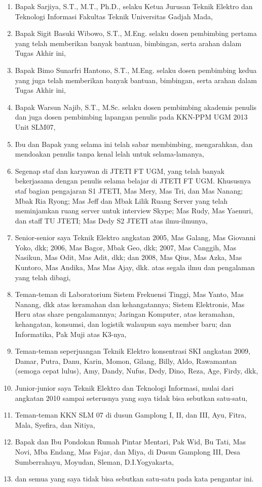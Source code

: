\documentclass{jtetiskripsi}
\begin{document}
\begin{enumerate}
\item{Bapak Sarjiya, S.T., M.T., Ph.D., selaku Ketua Jurusan Teknik Elektro dan Teknologi Informasi Fakultas Teknik Universitas Gadjah Mada,}
\item{Bapak Sigit Basuki Wibowo, S.T., M.Eng. selaku dosen pembimbing pertama yang telah memberikan banyak bantuan, bimbingan, serta arahan dalam Tugas Akhir ini,}
\item{Bapak Bimo Sunarfri Hantono, S.T., M.Eng. selaku dosen pembimbing kedua yang juga telah memberikan banyak bantuan, bimbingan, serta arahan dalam Tugas Akhir ini,}
\item{Bapak Warsun Najib, S.T., M.Sc. selaku dosen pembimbing akademis penulis dan juga dosen pembimbing lapangan penulis pada KKN-PPM UGM 2013 Unit SLM07,}
\item{Ibu dan Bapak yang selama ini telah sabar membimbing, mengarahkan, dan mendoakan penulis tanpa kenal lelah untuk selama-lamanya,}
\item{Segenap staf dan karyawan di JTETI FT UGM, yang telah banyak bekerjasama dengan penulis selama belajar di JTETI FT UGM. Khususnya staf bagian pengajaran S1 JTETI, Mas Mery, Mas Tri, dan Mas Nanang; Mbak Ria Ryong; Mas Jeff dan Mbak Lilik Ruang Server yang telah meminjamkan ruang server untuk interview Skype; Mas Rudy, Mas Yaenuri, dan staff TU JTETI; Mas Dedy S2 JTETI atas ilmu-ilmunya,} 
\item{Senior-senior saya Teknik Elektro angkatan 2005, Mas Galang, Mas Giovanni Yoko, dkk; 2006, Mas Bagor, Mbak Geo, dkk; 2007, Mas Canggih, Mas Nasikun, Mas Odit, Mas Adit, dkk; dan 2008, Mas Qius, Mas Azka, Mas Kuntoro, Mas Andika, Mas Mas Ajay, dkk. atas segala ilmu dan pengalaman yang telah dibagi,}
\item{Teman-teman di Laboratorium Sistem Frekuensi Tinggi, Mas Yanto, Mas Nanang, dkk atas keramahan dan kehangatannya; Sistem Elektronis, Mas Heru atas share pengalamannya; Jaringan Komputer, atas keramahan, kehangatan, konsumsi, dan logistik walaupun saya member baru; dan Informatika, Pak Muji atas K3-nya,}
\item{Teman-teman seperjuangan Teknik Elektro konsentrasi SKI angkatan 2009, Damar, Putra, Danu, Karin, Momon, Gilang, Billy, Aldo, Rawamantan (semoga cepat lulus), Amy, Dandy, Nufus, Dedy, Dino, Reza, Age, Firdy, dkk,}
\item{Junior-junior saya Teknik Elektro dan Teknologi Informasi, mulai dari angkatan 2010 sampai seterusnya yang saya tidak bisa sebutkan satu-satu,}
\item{Teman-teman KKN SLM 07 di dusun Gamplong I, II, dan III, Ayu, Fitra, Mala, Syefira, dan Nitiya,}
\item{Bapak dan Ibu Pondokan Rumah Pintar Mentari, Pak Wid, Bu Tati, Mas Novi, Mba Endang, Mas Fajar, dan Miya, di Dusun Gamplong III, Desa Sumberrahayu, Moyudan, Sleman, D.I.Yogyakarta,}
\item{dan semua yang saya tidak bisa sebutkan satu-satu pada kata pengantar ini.}
\end{enumerate}
\end{document}

